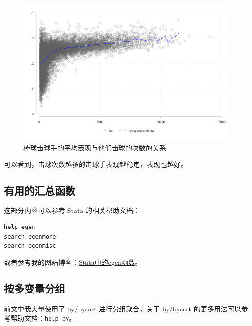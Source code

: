 \begin{figure}[htbp]
  \centering
  \includegraphics[width=\textwidth]{assets/scbaab.png}
  \caption{棒球击球手的平均表现与他们击球的次数的关系}
  \label{fig:scbaab}
\end{figure}

可以看到，击球次数越多的击球手表现越稳定，表现也越好。

\subsection{有用的汇总函数}

这部分内容可以参考 Stata 的相关帮助文档：

\begin{lstlisting}
help egen
search egenmore
search egenmisc
\end{lstlisting}

或者参考我的网站博客：\href{https://www.czxa.top/posts/18884/}{Stata中的egen函数}。

\subsection{按多变量分组}

前文中我大量使用了 by/bysort 进行分组聚合，关于 by/bysort 的更多用法可以参考帮助文档：\texttt{help by}。
